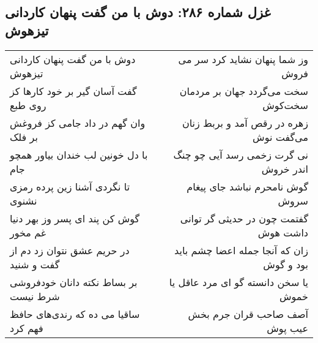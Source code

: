 \begin{center}
\section*{غزل شماره ۲۸۶: دوش با من گفت پنهان کاردانی تیزهوش}
\label{sec:sh286}
\begin{longtable}{l p{0.5cm} r}
دوش با من گفت پنهان کاردانی تیزهوش
&&
وز شما پنهان نشاید کرد سر می فروش
\\
گفت آسان گیر بر خود کارها کز روی طبع
&&
سخت می‌گردد جهان بر مردمان سخت‌کوش
\\
وان گهم در داد جامی کز فروغش بر فلک
&&
زهره در رقص آمد و بربط زنان می‌گفت نوش
\\
با دل خونین لب خندان بیاور همچو جام
&&
نی گرت زخمی رسد آیی چو چنگ اندر خروش
\\
تا نگردی آشنا زین پرده رمزی نشنوی
&&
گوش نامحرم نباشد جای پیغام سروش
\\
گوش کن پند ای پسر وز بهر دنیا غم مخور
&&
گفتمت چون در حدیثی گر توانی داشت هوش
\\
در حریم عشق نتوان زد دم از گفت و شنید
&&
زان که آنجا جمله اعضا چشم باید بود و گوش
\\
بر بساط نکته دانان خودفروشی شرط نیست
&&
یا سخن دانسته گو ای مرد عاقل یا خموش
\\
ساقیا می ده که رندی‌های حافظ فهم کرد
&&
آصف صاحب قران جرم بخش عیب پوش
\\
\end{longtable}
\end{center}
